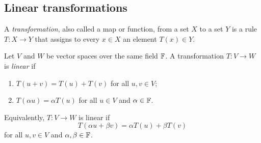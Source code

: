 \subsection{Linear transformations}

A \emph{transformation}, also called a map or function, from a set $X$
to a set $Y$ is a rule $T\colon X\to Y$ that assigns to every $x\in X$
an element $T(x)\in Y$.

\begin{definition}
  Let $V$ and $W$ be vector spaces over the same field $\mathbb{F}$. A
  transformation $T\colon V\to W$ is \emph{linear} if
  \begin{enumerate}[label=(\roman*)]
    \item $T(u+v)=T(u)+T(v)$ for all $u,v\in V$;
    \item $T(\alpha u)=\alpha T(u)$ for all $u\in V$ and
      $\alpha\in\mathbb{F}$.
  \end{enumerate}
\end{definition}

Equivalently, $T\colon V\to W$ is linear if
\[
  T(\alpha u+\beta v)=\alpha T(u)+\beta T(v)
\]
for all $u,v\in V$ and $\alpha,\beta\in\mathbb{F}$.

